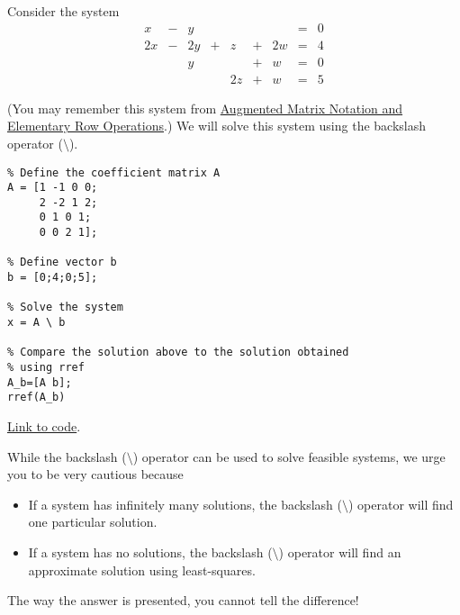 \documentclass{ximera}
\begin{document}
\begin{example}\label{temp:systems1}
Consider the system
\begin{equation}
\begin{array}{ccccccccc}
      x &- &y&&&&&= &0 \\
	 2x& -&2y&+&z&+&2w&=&4\\
     & &y&&&+&w&=&0\\
     & &&&2z&+&w&=&5
    \end{array}
    \end{equation}

 (You may remember this system from \href{https://ximera.osu.edu/linearalgebrav3/LinearAlgebraInteractiveIntro/SYS-0020/main}{Augmented Matrix Notation and Elementary Row Operations}.)  We will solve this system using the backslash operator ($\setminus$).   
\begin{verbatim}
% Define the coefficient matrix A
A = [1 -1 0 0;
     2 -2 1 2;
     0 1 0 1;
     0 0 2 1];

% Define vector b
b = [0;4;0;5];

% Solve the system 
x = A \ b

% Compare the solution above to the solution obtained
% using rref
A_b=[A b];
rref(A_b)
\end{verbatim}

\href{https://sagecell.sagemath.org/?z=eJxVj8EOgjAQRO9N-g9zIdEDSUv0RDgQ_QOPaAzFok2ANaUQ_Hu7UWLc20zf7GwTHG3rBovwsGjItq1rnB0C-jp4t6CUokSBSiPVUFC5FODJkGbQyFatwM_6J1VE9CVqKZK1Y7ZNIA8jheGdKt_lKt-v0Im6-XPH-BqD7SHFErESZ04wcaD-WfsvQ90UHA2oDXGM_l0yoY6VN45Noxvu8N628TNXU1QlDJeys4nG9g1f4kXS&lang=octave&interacts=eJyLjgUAARUAuQ==}{Link to code}.

\end{example}

\begin{warning}
  While the backslash ($\setminus$) operator can be used to solve feasible systems, we urge you to be very cautious because
\begin{itemize}
  \item If a system has infinitely many solutions, the backslash ($\setminus$) operator will find one particular solution.
  \item If a system has no solutions, the backslash ($\setminus$) operator will find an approximate solution using least-squares.  
\end{itemize}
The way the answer is presented, you cannot tell the difference!
\end{warning}
\end{document}
